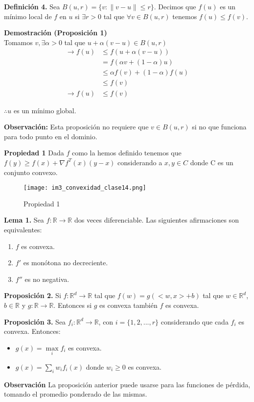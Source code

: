 \documentclass{article}
\providecommand{\norm}[1]{\lVert#1\rVert}
\begin{document}
\textbf{Definición 4.} Sea $B(u,r)=\{v:\norm{v-u}\leq r\}$. Decimos que $f(u)$ es un mínimo local de $f$ en $u$ si $\exists r>0 $ tal que $\forall v \in B(u,r)$ tenemos $f(u)\leq f(v)$.

\textbf{Demostración (Proposición 1)}
\newline
\\Tomamos $v, \exists \alpha>0$ tal que $u+\alpha (v-u) \in B(u,r)$ \begin{align*}
     \rightarrow f(u)&\leq f(u+\alpha(v-u))\\
     &=f(\alpha v + (1-\alpha) u)\\
     &\leq \alpha f(v)+ (1-\alpha) f(u)\\
     &\leq f(v)\\
     \rightarrow f(u)&\leq f(v)
\end{align*}
\begin{center}
$\therefore u$ es un mínimo global.   
\end{center}
\textbf{Observación:} Esta proposición no requiere que $v\in B(u,r)$ si no que funciona para todo punto en el dominio.  

\textbf{Propiedad 1} Dada $f$ como la hemos definido tenemos que $f(y)\geq f(x) + \nabla f^{T}(x)(y-x)$ considerando a $x,y \in C$ donde C es un conjunto convexo.
\begin{figure}[h]
\caption{Propiedad 1}
\centering
\texttt{[image: im3\_convexidad\_clase14.png]}
\end{figure}
\newpage
\textbf{Lema 1.} Sea $f:\mathbb{R}\rightarrow \mathbb{R}$ dos veces diferenciable. Las siguientes afirmaciones son equivalentes: 
\begin{enumerate}
    \item $f$ es convexa.
    \item $f'$ es monótona no decreciente.
    \item $f''$ es no negativa.
\end{enumerate}

\textbf{Proposición 2.}  Si $f:\mathbb{R}^{d}\rightarrow \mathbb{R}$ tal que $f(w)=g(<w,x>+b)$ tal que $w \in \mathbb{R}^{d}$, $b\in\mathbb{R}$ y $g:\mathbb{R}\rightarrow \mathbb{R}$. Entonces si $g$ es convexa también $f$ es convexa.

\textbf{Proposición 3.} Sea $f_{i}:\mathbb{R}^{d}\rightarrow\mathbb{R}$, con $i=\{1,2,...,r\}$ considerando que cada $f_{i}$ es convexa. Entonces:
\begin{itemize}
    \item $g(x)=\max\limits_{i} f_{i}$ es convexa.
    \item $g(x)=\sum_{i} w_{i}f_{i}(x)$ donde $w_{i}\geq 0$ es convexa.
\end{itemize}
\textbf{Observación} La proposición anterior puede usarse para las funciones de pérdida, tomando el promedio ponderado de las mismas.
\end{document}
